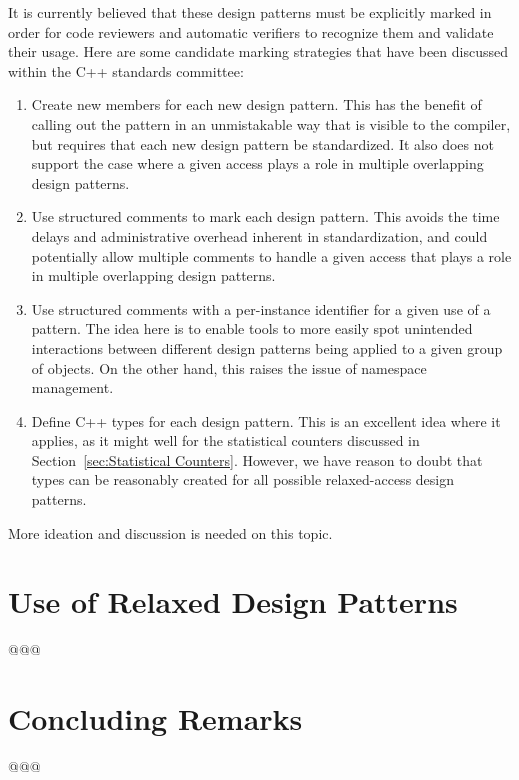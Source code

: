 \documentclass{article}
\begin{document}
It is currently believed that these design patterns must be explicitly marked
in order for code reviewers and automatic verifiers to recognize them
and validate their usage.
Here are some candidate marking strategies that have been discussed
within the C++ standards committee:

\begin{enumerate}
\item	Create new   members for each new
	design pattern.
	This has the benefit of calling out the pattern in an unmistakable
	way that is visible to the compiler, but requires that each
	new design pattern be standardized.
	It also does not support the case where a given access plays a
	role in multiple overlapping design patterns.
\item	Use structured comments to mark each design pattern.
	This avoids the time delays and administrative overhead inherent
	in standardization, and could potentially allow multiple comments
	to handle a given access that plays a role in multiple overlapping
	design patterns.
\item	Use structured comments with a per-instance identifier for
	a given use of a pattern.
	The idea here is to enable tools to more easily spot
	unintended interactions between different design patterns
	being applied to a given group of objects.
	On the other hand, this raises the issue of namespace management.
\item	Define C++  types for each design pattern.
	This is an excellent idea where it applies, as it might well
	for the statistical counters discussed in
	Section~\ref{sec:Statistical Counters}.
	However, we have reason to doubt that  types can
	be reasonably created for all possible relaxed-access design
	patterns.
\end{enumerate}

More ideation and discussion is needed on this topic.

\section{Use of Relaxed Design Patterns}
\label{sec:Use of Relaxed Design Patterns}

@@@

\section{Concluding Remarks}
\label{sec:Concluding Remarks}

@@@




\end{document}
